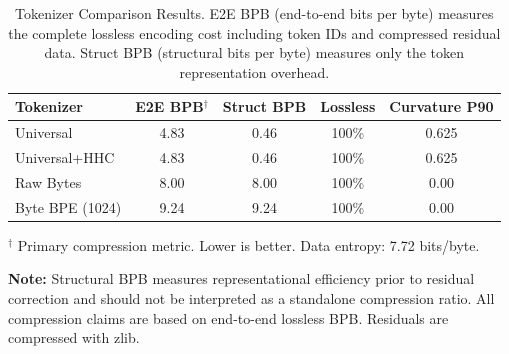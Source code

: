 
\begin{table}[t]
\centering
\caption{Tokenizer Comparison Results. E2E BPB (end-to-end bits per byte) measures the
complete lossless encoding cost including token IDs and compressed residual data.
Struct BPB (structural bits per byte) measures only the token representation overhead.}
\label{tab:results}
\begin{tabular}{lcccc}
\toprule
Tokenizer & E2E BPB$^\dagger$ & Struct BPB & Lossless & Curvature P90 \\
\midrule
Universal & 4.83 & 0.46 & 100\% & 0.625 \\
Universal+HHC & 4.83 & 0.46 & 100\% & 0.625 \\
Raw Bytes & 8.00 & 8.00 & 100\% & 0.00 \\
Byte BPE (1024) & 9.24 & 9.24 & 100\% & 0.00 \\
\bottomrule
\end{tabular}

\vspace{0.5em}
\footnotesize{$^\dagger$ Primary compression metric. Lower is better. Data entropy: 7.72 bits/byte.}

\vspace{0.5em}
\textbf{Note:} Structural BPB measures representational efficiency prior to residual
correction and should not be interpreted as a standalone compression ratio. All compression
claims are based on end-to-end lossless BPB. Residuals are compressed with zlib.
\end{table}

